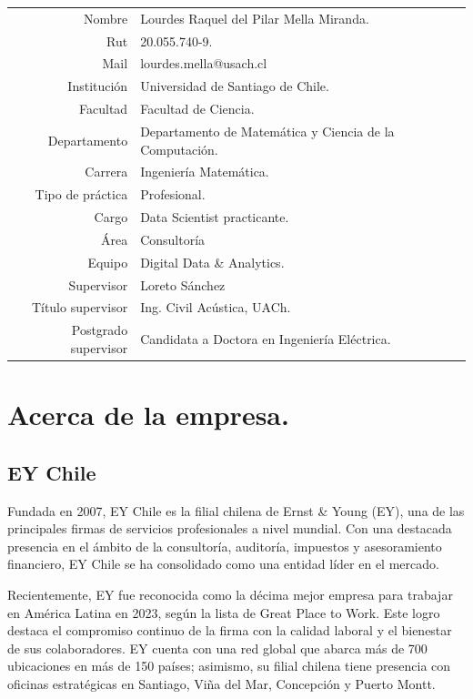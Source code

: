 \documentclass{article}
\begin{document}
\begin{tabular}{r l}
	Nombre & Lourdes Raquel del Pilar Mella Miranda.\\ 
	Rut & 20.055.740-9.\\
	Mail & lourdes.mella@usach.cl\\
	Institución & Universidad de Santiago de Chile.\\
	Facultad & Facultad de Ciencia.\\
	Departamento & Departamento de Matemática y Ciencia de la Computación.\\
	Carrera & Ingeniería Matemática.\\
	Tipo de práctica & Profesional.\\
	Cargo & Data Scientist practicante.\\
	Área & Consultoría\\
	Equipo & Digital Data \& Analytics.\\
	Supervisor & Loreto Sánchez\\
	Título supervisor & Ing. Civil Acústica, UACh.\\
	Postgrado supervisor & Candidata a Doctora en Ingeniería Eléctrica.

\end{tabular}

\section{Acerca de la empresa.}

\subsection{EY Chile}

Fundada en 2007, EY Chile es la filial chilena de Ernst \& Young (EY), una de las principales firmas de servicios profesionales a nivel mundial. Con una destacada presencia en el ámbito de la consultoría, auditoría, impuestos y asesoramiento financiero, EY Chile se ha consolidado como una entidad líder en el mercado. 

Recientemente, EY fue reconocida como la décima mejor empresa para trabajar en América Latina en 2023, según la lista de Great Place to Work. Este logro destaca el compromiso continuo de la firma con la calidad laboral y el bienestar de sus colaboradores. EY cuenta con una red global que abarca más de 700 ubicaciones en más de 150 países; asimismo, su filial chilena tiene presencia con oficinas estratégicas en Santiago, Viña del Mar, Concepción y Puerto Montt.
\end{document}
